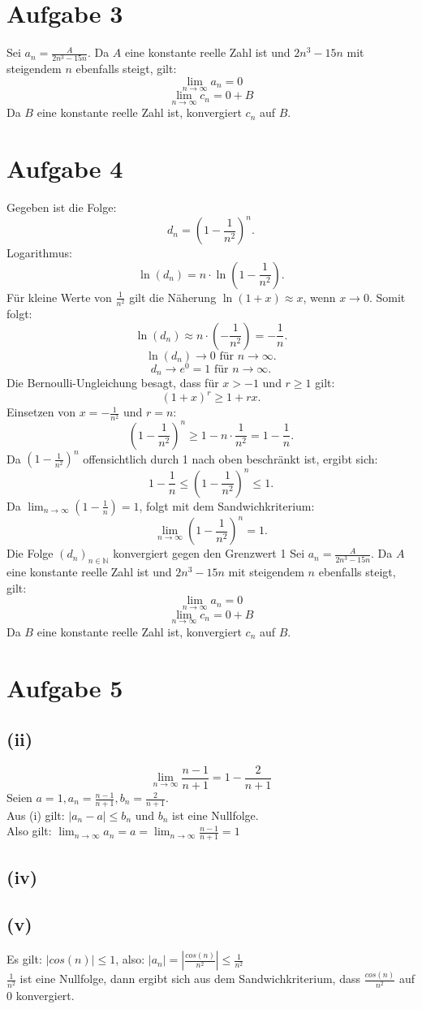 \documentclass{article}
\begin{document}
\section{Aufgabe 3}
Sei $a_n = \frac{A}{2n^3-15n}$. Da $A$ eine konstante reelle Zahl ist und $2n^3-15n$ mit steigendem $n$ ebenfalls steigt, gilt:
\[\lim_{n \to \infty} a_n = 0\]
\[\lim_{n \to \infty} c_n = 0 + B\]
Da $B$ eine konstante reelle Zahl ist, konvergiert $c_n$ auf $B$.


\section{Aufgabe 4}
Gegeben ist die Folge:
\[d_n = \left(1 - \frac{1}{n^2}\right)^n.\]
Logarithmus:
\[\ln(d_n) = n \cdot \ln\left(1 - \frac{1}{n^2}\right).\]
Für kleine Werte von \(\frac{1}{n^2}\) gilt die Näherung \(\ln(1 + x) \approx x\), wenn \(x \to 0\). Somit folgt:
\[\ln(d_n) \approx n \cdot \left(-\frac{1}{n^2}\right) = -\frac{1}{n}.\]
\[\ln(d_n) \to 0 \text{ für } n \to \infty.\]
\[d_n \to e^0 = 1 \text{ für } n \to \infty.\]
Die Bernoulli-Ungleichung besagt, dass für \(x > -1\) und \(r \geq 1\) gilt:
\[(1 + x)^r \geq 1 + rx.\]
Einsetzen von \(x = -\frac{1}{n^2}\) und \(r = n\):
\[\left(1 - \frac{1}{n^2}\right)^n \geq 1 - n \cdot \frac{1}{n^2} = 1 - \frac{1}{n}.\]
Da \(\left(1 - \frac{1}{n^2}\right)^n\) offensichtlich durch 1 nach oben beschränkt ist, ergibt sich:
\[1 - \frac{1}{n} \leq \left(1 - \frac{1}{n^2}\right)^n \leq 1.\]
Da \(\lim_{n \to \infty} \left(1 - \frac{1}{n}\right) = 1\), folgt mit dem Sandwichkriterium:
\[\lim_{n \to \infty} \left(1 - \frac{1}{n^2}\right)^n = 1.\]
Die Folge \((d_n)_{n \in \mathbb{N}}\) konvergiert gegen den Grenzwert 1
Sei $a_n = \frac{A}{2n^3-15n}$. Da $A$ eine konstante reelle Zahl ist und $2n^3-15n$ mit steigendem $n$ ebenfalls steigt, gilt:
\[\lim_{n \to \infty} a_n = 0\]
\[\lim_{n \to \infty} c_n = 0 + B\]
Da $B$ eine konstante reelle Zahl ist, konvergiert $c_n$ auf $B$.

\section{Aufgabe 5}
\subsection{(ii)}
\[\lim_{n \to \infty} \frac{n-1}{n+1} = 1 - \frac{2}{n+1}\]
Seien $a = 1, a_n = \frac{n-1}{n+1}, b_n = \frac{2}{n+1}$. \\
Aus (i) gilt: $|a_n - a| \leq b_n$ und $b_n$ ist eine Nullfolge. \\
Also gilt: $\lim_{n\to\infty}a_n = a = \lim_{n\to\infty}\frac{n-1}{n+1} = 1$
\subsection{(iv)}

\subsection{(v)}
Es gilt: $|cos(n)| \leq 1$, also: $|a_n| = \left|\frac{cos(n)}{n^2}\right| \leq \frac{1}{n^2}$ \\
\newline
$\frac{1}{n^2}$ ist eine Nullfolge, dann ergibt sich aus dem Sandwichkriterium, dass $\frac{cos(n)}{n^2}$ auf 0 konvergiert.
\end{document}
